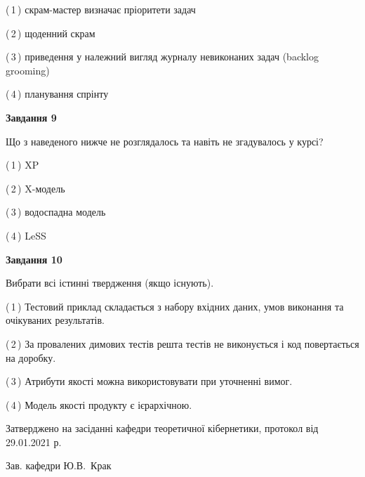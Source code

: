 \documentclass[10pt, ukrainian]{article}
\begin{document}
{\begin {large}
(\,1\,) скрам-мастер визначає пріоритети задач%



(\,2\,) щоденний скрам%



(\,3\,) приведення у належний вигляд журналу невиконаних задач (backlog grooming) %



(\,4\,) планування спрінту%


{\begin {center}\textbf{Завдання 9}\end {center}}\par
Що з наведеного нижче не розглядалось та навіть не згадувалось у курсі?\par
\vspace{2mm}



(\,1\,) XP%



(\,2\,) X-модель%



(\,3\,) водоспадна модель%



(\,4\,) LeSS%


{\begin {center}\textbf{Завдання 10}\end {center}}\par
Вибрати всі істинні твердження (якщо існують).\par
\vspace{2mm}



(\,1\,) Тестовий приклад складається з набору вхідних даних, умов виконання та очікуваних результатів.%



(\,2\,) За провалених димових тестів решта тестів не виконується і код повертається на доробку.%



(\,3\,) Атрибути якості можна використовувати при уточненні вимог.%



(\,4\,) Модель якості продукту є ієрархічною.%



\end {large}}
{\vspace{5mm}\smallskip \begin {small} Затверджено на засіданні кафедри теоретичної кібернетики, протокол  від   29.01.2021 р.\par\smallskip\smallskip
{\parbox {6.5 cm}{Зав. кафедри \dotfill Ю.В.~Крак}} \end{small}}
\newpage
\end{document}
